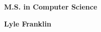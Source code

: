 \documentclass[11pt]{article}
\newcommand{\name}[1]{\textbf{#1}}
\newcommand{\program}[1]{\textbf{#1}}
\begin{document}

\program{M.S. in Computer Science}

\name{Lyle Franklin}








\end{document}
